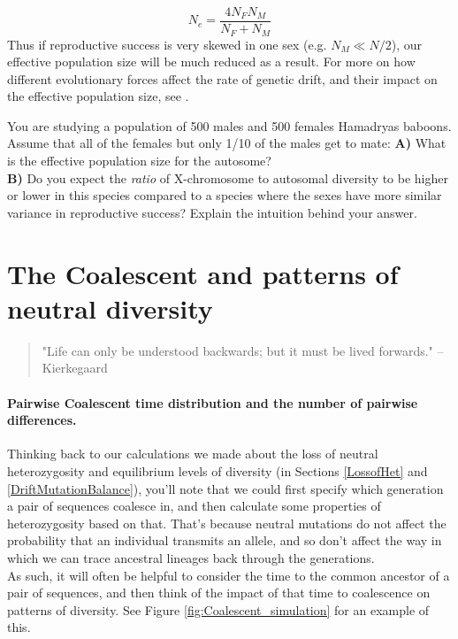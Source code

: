 \begin{equation}
N_e = \frac{4N_FN_M}{N_F+N_M}
\end{equation}
Thus if reproductive success is very skewed in one sex (e.g. $N_M \ll
N/2$), our effective population size will be much reduced as a result. For more on how different evolutionary forces affect the rate of genetic drift, and their impact on the effective population size, see \citet{charlesworth:09}.\\

\begin{question}
You are studying a population of 500 males and 500 females Hamadryas baboons. Assume that all of the females but only 1/10 of the males get to mate: 
{\bf A)} What is the effective population size for the autosome?\\
{\bf B)} Do you expect the {\it ratio} of X-chromosome to autosomal diversity to be higher or lower in this species compared to a species where the sexes have more similar variance in reproductive success? Explain the intuition behind your answer.
 \end{question}


\section{The Coalescent and patterns of neutral diversity}

\begin{quote}
"Life can only be understood backwards; but it must be lived
forwards." -- Kierkegaard
\end{quote}

\paragraph{Pairwise Coalescent time distribution and the number of
 pairwise differences.}
Thinking back to our calculations we made about the loss of neutral heterozygosity
and equilibrium levels of diversity (in Sections \ref{LossofHet} and \ref{DriftMutationBalance}), you'll note that we could first specify
which generation a pair of sequences coalesce in, and then calculate
some properties of heterozygosity based on that. That's because neutral
mutations do not affect the probability that an individual transmits
an allele, and so don't affect the way in which we can trace ancestral lineages
back through the generations. \\


As such, it will often be helpful to consider the time to the common
ancestor of a pair of sequences, and then think of the impact of that time to coalescence
on patterns of diversity. See Figure \ref{fig:Coalescent_simulation}
for an example of this. 

